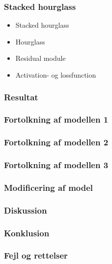 \documentclass{beamer}
\begin{document}
\begin{frame}
    \frametitle{Stacked hourglass}
    \begin{minipage}{1\textwidth}
        \begin{itemize}
            \item<2-> Stacked hourglass
            \item<3-> Hourglass
            \item<4-> Residual module
            \item<5-> Activation- og lossfunction
        \end{itemize}
    \end{minipage}
    \begin{minipage}{1\textwidth}
    \end{minipage}
\end{frame}

\begin{frame}
    \frametitle{Resultat}
\end{frame}

\begin{frame}
    \frametitle{Fortolkning af modellen 1}
\end{frame}

\begin{frame}
    \frametitle{Fortolkning af modellen 2}
\end{frame}

\begin{frame}
    \frametitle{Fortolkning af modellen 3}
\end{frame}

\begin{frame}
    \frametitle{Modificering af model}
\end{frame}

\begin{frame}
    \frametitle{Diskussion}
\end{frame}

\begin{frame}
    \frametitle{Konklusion}
\end{frame}

\begin{frame}
    \frametitle{Fejl og rettelser}
\end{frame}
\end{document}
